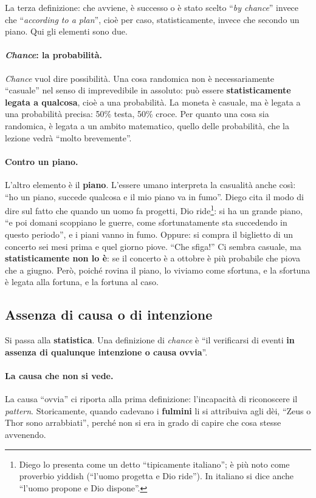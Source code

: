 La terza definizione: che avviene, è successo o è stato scelto ``\emph{by chance}'' invece
che ``\emph{according to a plan}'', cioè per caso, statisticamente, invece che secondo un
piano. Qui gli elementi sono due.

\paragraph{\emph{Chance}: la probabilità.} \emph{Chance} vuol dire possibilità. Una cosa
randomica non è necessariamente ``casuale'' nel senso di imprevedibile in assoluto: può essere
\textbf{statisticamente legata a qualcosa}, cioè a una probabilità. La moneta è casuale, ma
è legata a una probabilità precisa: 50\% testa, 50\% croce. Per quanto una cosa sia
randomica, è legata a un ambito matematico, quello delle probabilità, che la lezione
vedrà ``molto brevemente''.

\paragraph{Contro un piano.} L'altro elemento è il \textbf{piano}. L'essere umano interpreta
la casualità anche così: ``ho un piano, succede qualcosa e il mio piano va in fumo''. Diego
cita il modo di dire sul fatto che quando un uomo fa progetti, Dio ride\footnote{Diego lo
presenta come un detto ``tipicamente italiano''; è più noto come proverbio yiddish (``l'uomo
progetta e Dio ride''). In italiano si dice anche ``l'uomo propone e Dio dispone''.}: si ha
un grande piano, ``e poi domani scoppiano le guerre, come sfortunatamente sta succedendo in
questo periodo'', e i piani vanno in fumo. Oppure: si compra il biglietto di un concerto sei
mesi prima e quel giorno piove. ``Che sfiga!'' Ci sembra casuale, ma \textbf{statisticamente
non lo è}: se il concerto è a ottobre è più probabile che piova che a giugno. Però, poiché
rovina il piano, lo viviamo come sfortuna, e la sfortuna è legata alla fortuna, e la fortuna
al caso.

\subsection{Assenza di causa o di intenzione}

Si passa alla \textbf{statistica}. Una definizione di \emph{chance} è ``il verificarsi di
eventi \textbf{in assenza di qualunque intenzione o causa ovvia}''.

\paragraph{La causa che non si vede.} La causa ``ovvia'' ci riporta alla prima definizione:
l'incapacità di riconoscere il \emph{pattern}. Storicamente, quando cadevano i
\textbf{fulmini} li si attribuiva agli dèi, ``Zeus o Thor sono arrabbiati'', perché non si
era in grado di capire che cosa stesse avvenendo.


